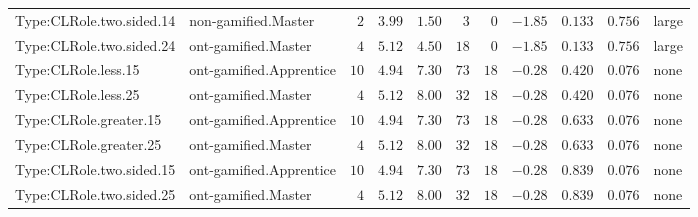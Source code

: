 \documentclass[6pt,a4paper]{article}
\begin{document}
{\begin{longtable}{llrrrrrrrrl}
Type:CLRole.two.sided.14&non-gamified.Master&$ 2$&$3.99$&$ 1.50$&$  3$&$ 0$&$-1.85$&$0.133$&$0.756$&large\tabularnewline
Type:CLRole.two.sided.24&ont-gamified.Master&$ 4$&$5.12$&$ 4.50$&$ 18$&$ 0$&$-1.85$&$0.133$&$0.756$&large\tabularnewline
Type:CLRole.less.15&ont-gamified.Apprentice&$10$&$4.94$&$ 7.30$&$ 73$&$18$&$-0.28$&$0.420$&$0.076$&none\tabularnewline
Type:CLRole.less.25&ont-gamified.Master&$ 4$&$5.12$&$ 8.00$&$ 32$&$18$&$-0.28$&$0.420$&$0.076$&none\tabularnewline
Type:CLRole.greater.15&ont-gamified.Apprentice&$10$&$4.94$&$ 7.30$&$ 73$&$18$&$-0.28$&$0.633$&$0.076$&none\tabularnewline
Type:CLRole.greater.25&ont-gamified.Master&$ 4$&$5.12$&$ 8.00$&$ 32$&$18$&$-0.28$&$0.633$&$0.076$&none\tabularnewline
\newpage
Type:CLRole.two.sided.15&ont-gamified.Apprentice&$10$&$4.94$&$ 7.30$&$ 73$&$18$&$-0.28$&$0.839$&$0.076$&none\tabularnewline
Type:CLRole.two.sided.25&ont-gamified.Master&$ 4$&$5.12$&$ 8.00$&$ 32$&$18$&$-0.28$&$0.839$&$0.076$&none\tabularnewline
\hline
\end{longtable}}
\end{document}
